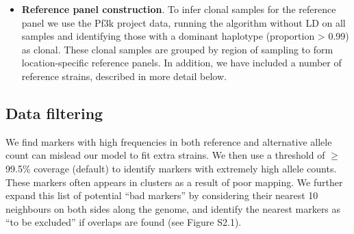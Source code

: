 \documentclass[9pt,lineno]{elife}
\begin{document}
\begin{itemize}
\begin{itemize}
\item {\bf Reference panel construction}. To infer clonal samples for the reference panel we use the Pf3k project data, running the algorithm without LD on all samples and identifying those with a dominant haplotype (proportion > 0.99) as clonal.  These clonal samples are grouped by region of sampling to form location-specific reference panels.  In addition, we have included a number of reference strains, described in more detail below.

\end{itemize}


\end{itemize}


\subsection{Data filtering}
We find markers with high frequencies in both reference and alternative allele count can mislead our model to fit extra strains. We then use a threshold of $\geq$ 99.5\% coverage (default) to identify markers with extremely high allele counts. These markers often appears in clusters as a result of poor mapping. We further expand this list of potential “bad markers” by considering their nearest 10 neighbours on both sides along the genome, and identify the nearest markers as “to be excluded” if overlaps are found (see Figure S2.1).
\end{document}
